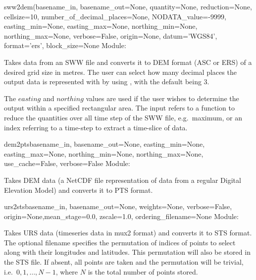 \documentclass{manual}
\begin{document}
\begin{funcdesc}{sww2dem}{(basename_in,
            basename_out=None,
            quantity=None,
            reduction=None,
            cellsize=10,
            number_of_decimal_places=None,
            NODATA_value=-9999,
            easting_min=None,
            easting_max=None,
            northing_min=None,
            northing_max=None,
            verbose=False,
            origin=None,
            datum='WGS84',
            format='ers',
            block_size=None}
Module: 

Takes data from an SWW file  and converts it to DEM format (ASC or
ERS) of a desired grid size  in metres. The user can select how
many decimal places the output data is represented with by using ,
with the default being 3.

The $easting$ and $northing$ values are used if the user wishes to determine the output
within a specified rectangular area. The  input refers to a function
to reduce the quantities over all time step of the SWW file, e.g.\ maximum, or an index referring 
to a time-step to extract a time-slice of data.

\end{funcdesc}

\begin{funcdesc}{dem2pts}{basename_in, basename_out=None,
            easting_min=None, easting_max=None,
            northing_min=None, northing_max=None,
            use_cache=False, verbose=False}
  Module: 

  Takes DEM data (a NetCDF file representation of data from a regular Digital
  Elevation Model) and converts it to PTS format.
\end{funcdesc}

\begin{funcdesc}{urs2sts}{basename_in, basename_out=None,
            weights=None, verbose=False,
            origin=None,mean_stage=0.0,
            zscale=1.0, ordering_filename=None}
  Module: 

  Takes URS data (timeseries data in mux2 format) and converts it to STS format.
  The optional filename  specifies the permutation of indices
  of points to select along with their longitudes and latitudes. This permutation will also be
  stored in the STS file. If absent, all points are taken and the permutation will be trivial,
  i.e.\ $0, 1, \ldots, N-1$, where $N$ is the total number of points stored.  
\end{funcdesc}
\end{document}

